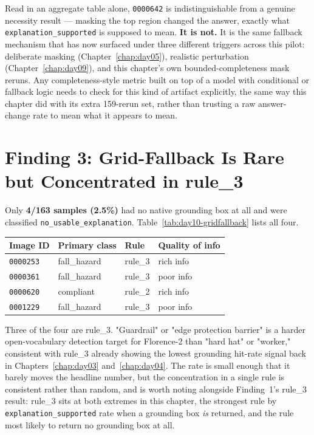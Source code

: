 Read in an aggregate table alone, \texttt{0000642} is indistinguishable from a genuine necessity result
--- masking the top region changed the answer, exactly what \texttt{explanation\_supported} is supposed
to mean. \textbf{It is not.} It is the same fallback mechanism that has now surfaced under three
different triggers across this pilot: deliberate masking (Chapter~\ref{chap:day05}), realistic
perturbation (Chapter~\ref{chap:day09}), and this chapter's own bounded-completeness mask reruns. Any
completeness-style metric built on top of a model with conditional or fallback logic needs to check for
this kind of artifact explicitly, the same way this chapter did with its extra 159-rerun set, rather
than trusting a raw answer-change rate to mean what it appears to mean.

\section{Finding 3: Grid-Fallback Is Rare but Concentrated in rule\_3}

Only \textbf{4/163 samples (2.5\%)} had no native grounding box at all and were classified
\texttt{no\_\allowbreak usable\_\allowbreak explanation}. Table~\ref{tab:day10-gridfallback} lists all
four.

\begin{center}
\begin{tabular}{p{2.0cm}p{2.6cm}p{1.6cm}p{2.6cm}}
\toprule
\textbf{Image ID} & \textbf{Primary class} & \textbf{Rule} & \textbf{Quality of info} \\
\midrule
\texttt{0000253} & fall\_hazard & rule\_3 & rich info \\
\texttt{0000361} & fall\_hazard & rule\_3 & poor info \\
\texttt{0000620} & compliant & rule\_2 & rich info \\
\texttt{0001229} & fall\_hazard & rule\_3 & poor info \\
\bottomrule
\end{tabular}
\label{tab:day10-gridfallback}
\end{center}

Three of the four are rule\_3. "Guardrail" or "edge protection barrier" is a harder open-vocabulary
detection target for Florence-2 than "hard hat" or "worker," consistent with rule\_3 already showing the
lowest grounding hit-rate signal back in Chapters~\ref{chap:day03} and~\ref{chap:day04}. The rate is
small enough that it barely moves the headline number, but the concentration in a single rule is
consistent rather than random, and is worth noting alongside Finding~1's rule\_3 result: rule\_3 sits at
both extremes in this chapter, the strongest rule by \texttt{explanation\_supported} rate when a
grounding box \emph{is} returned, and the rule most likely to return no grounding box at all.

